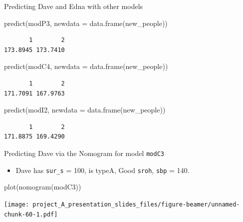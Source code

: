 \documentclass[
  ignorenonframetext,
]{beamer}
\newenvironment{Shaded}{\begin{snugshade}}{\end{snugshade}}
\newcommand{\AttributeTok}[1]{\textcolor[rgb]{0.77,0.63,0.00}{#1}}
\newcommand{\FunctionTok}[1]{\textcolor[rgb]{0.00,0.00,0.00}{#1}}
\newcommand{\NormalTok}[1]{#1}
\providecommand{\tightlist}{%
  \setlength{\itemsep}{0pt}\setlength{\parskip}{0pt}}
\begin{document}
\begin{frame}[fragile]{Predicting Dave and Edna with other models}
\protect\hypertarget{predicting-dave-and-edna-with-other-models}{}
\begin{Shaded}
\begin{Highlighting}[]
\FunctionTok{predict}\NormalTok{(modP3, }\AttributeTok{newdata =} \FunctionTok{data.frame}\NormalTok{(new\_people))}
\end{Highlighting}
\end{Shaded}

\begin{verbatim}
       1        2 
173.8945 173.7410 
\end{verbatim}

\begin{Shaded}
\begin{Highlighting}[]
\FunctionTok{predict}\NormalTok{(modC4, }\AttributeTok{newdata =} \FunctionTok{data.frame}\NormalTok{(new\_people))}
\end{Highlighting}
\end{Shaded}

\begin{verbatim}
       1        2 
171.7091 167.9763 
\end{verbatim}

\begin{Shaded}
\begin{Highlighting}[]
\FunctionTok{predict}\NormalTok{(modI2, }\AttributeTok{newdata =} \FunctionTok{data.frame}\NormalTok{(new\_people))}
\end{Highlighting}
\end{Shaded}

\begin{verbatim}
       1        2 
171.8875 169.4290 
\end{verbatim}
\end{frame}

\begin{frame}[fragile]{Predicting Dave via the Nomogram for model
\texttt{modC3}}
\protect\hypertarget{predicting-dave-via-the-nomogram-for-model-modc3}{}
\begin{itemize}
\tightlist
\item
  Dave has \texttt{sur\_s} = 100, is typeA, Good \texttt{sroh},
  \texttt{sbp} = 140.
\end{itemize}

\begin{Shaded}
\begin{Highlighting}[]
\FunctionTok{plot}\NormalTok{(}\FunctionTok{nomogram}\NormalTok{(modC3))}
\end{Highlighting}
\end{Shaded}

\texttt{[image: project\_A\_presentation\_slides\_files/figure-beamer/unnamed-chunk-60-1.pdf]}
\end{frame}
\end{document}
